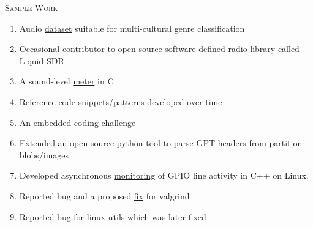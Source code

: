 \documentclass{article}
\begin{document}
\textsc{\huge{Sample Work}}
\newline
\begin{enumerate}[label=(\Alph*)]
\item Audio \href{https://github.com/fsheikh/QawwalRang}{dataset} suitable for multi-cultural genre classification
\item Occasional \href{https://github.com/jgaeddert/liquid-dsp/commits?author=fsheikh}{contributor} to open source software defined radio library called Liquid-SDR
\item A sound-level \href{https://github.com/jgaeddert/liquid-dsp/pull/153}{meter} in C
\item Reference code-snippets/patterns \href{https://github.com/fsheikh/sample\_code}{developed} over time
\item An embedded coding \href{https://github.com/GermanAutolabs/Embedded-coding-challenge}{challenge}
\item Extended an open source python \href{https://github.com/pvachon/pygpt}{tool} to parse GPT headers from partition blobs/images
\item Developed asynchronous \href{https://github.com/starnight/libgpiod-example/pull/1/files}{monitoring} of GPIO line activity in C++ on Linux.
\item Reported bug and a proposed \href{https://bugs.kde.org/show_bug.cgi?id=449309}{fix} for valgrind
\item Reported \href{https://github.com/util-linux/util-linux/issues/1582}{bug} for linux-utils which was later fixed

\end{enumerate}
\end{document}
